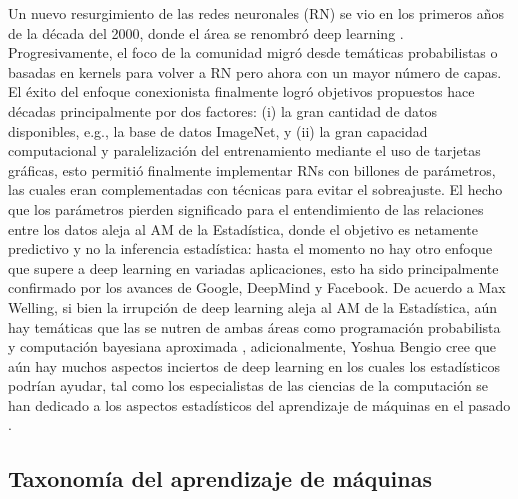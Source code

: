 Un nuevo resurgimiento de las redes neuronales (RN) se vio en los primeros años de la década del 2000, donde el área se renombró deep learning \cite{bengio_2009}. Progresivamente, el foco de la comunidad migró desde temáticas probabilistas o basadas en kernels para volver a RN pero ahora con un mayor número de capas. El éxito del enfoque conexionista finalmente logró objetivos propuestos hace décadas principalmente por dos factores: (i) la gran cantidad de datos disponibles, e.g., la base de datos ImageNet, y (ii) la gran capacidad computacional y paralelización del entrenamiento mediante el uso de tarjetas gráficas, esto permitió finalmente implementar RNs con billones de parámetros, las cuales eran complementadas con técnicas para evitar el sobreajuste. El hecho que los parámetros pierden significado para el entendimiento de las relaciones entre los datos aleja al AM de la Estadística, donde el objetivo es netamente predictivo y no la inferencia estadística: hasta el momento no hay otro enfoque que supere a deep learning en variadas aplicaciones, esto ha sido principalmente confirmado por los avances de Google, DeepMind y Facebook. De acuerdo a Max Welling, si bien la irrupción de deep learning aleja al AM de la Estadística, aún hay temáticas que las se nutren de ambas áreas como programación probabilista y computación bayesiana aproximada \cite{welling_2015}, adicionalmente, Yoshua Bengio cree que aún hay muchos aspectos inciertos de deep learning en los cuales los estadísticos podrían ayudar, tal como los especialistas de las ciencias de la computación se han dedicado a los aspectos estadísticos del aprendizaje de máquinas en el pasado \cite{bengio_2016}. 


\subsection{Taxonomía del aprendizaje de máquinas}

